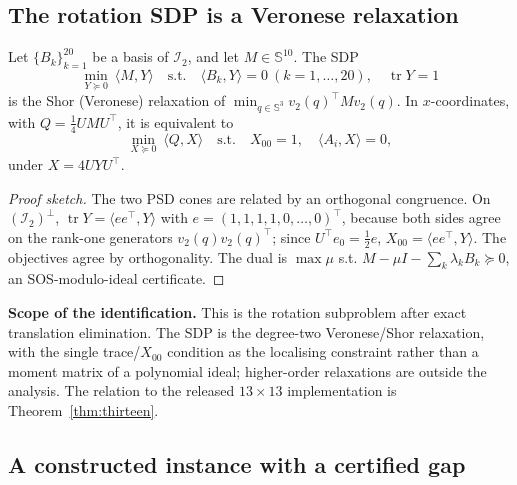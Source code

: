 \subsection{The rotation SDP is a Veronese relaxation}\label{sec:sdp}

\begin{theorem}\label{thm:sdp}
Let $\{B_k\}_{k=1}^{20}$ be a basis of $\mathcal{I}_2$, and let $M\in\mathbb{S}^{10}$. The SDP
\begin{equation}
\min_{Y\succeq0}\ \langle M,Y\rangle\quad\text{s.t.}\quad \langle B_k,Y\rangle=0\ (k=1,\dots,20),\quad \operatorname{tr}Y=1
\label{eq:sdpY}
\end{equation}
is the Shor (Veronese) relaxation of $\min_{q\in\mathbb{S}^3}v_2(q)^\top Mv_2(q)$. In $x$-coordinates, with $Q=\tfrac14UMU^\top$, it is equivalent to
\begin{equation}
\min_{X\succeq0}\ \langle Q,X\rangle\quad\text{s.t.}\quad X_{00}=1,\quad \langle A_i,X\rangle=0,
\label{eq:sdpX}
\end{equation}
under $X=4UYU^\top$.
\end{theorem}

\begin{proof}[Proof sketch]
The two PSD cones are related by an orthogonal congruence. On $(\mathcal{I}_2)^\perp$, $\operatorname{tr}Y=\langle ee^\top,Y\rangle$ with $e=(1,1,1,1,0,\dots,0)^\top$, because both sides agree on the rank-one generators $v_2(q)v_2(q)^\top$; since $U^\top e_0=\tfrac12e$, $X_{00}=\langle ee^\top,Y\rangle$. The objectives agree by orthogonality. The dual is $\max\mu$ s.t. $M-\mu I-\sum_k\lambda_kB_k\succeq0$, an SOS-modulo-ideal certificate.
\end{proof}

\textbf{Scope of the identification.} This is the rotation subproblem after exact translation elimination. The SDP is the degree-two Veronese/Shor relaxation, with the single trace/$X_{00}$ condition as the localising constraint rather than a moment matrix of a polynomial ideal; higher-order relaxations are outside the analysis. The relation to the released $13\times13$ implementation is Theorem~\ref{thm:thirteen}.

\subsection{A constructed instance with a certified gap}\label{sec:example}

